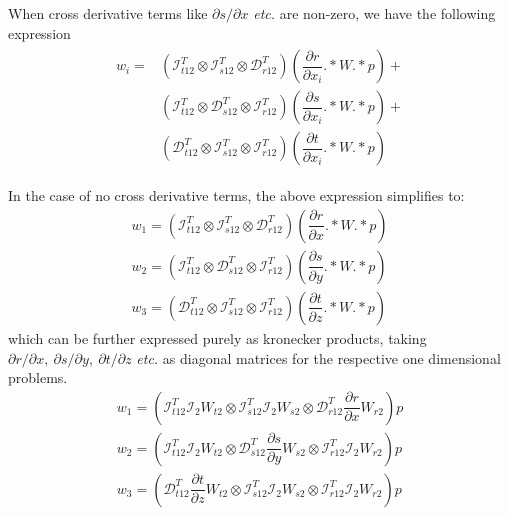 \documentclass{kthreport}
\begin{document}
When cross derivative terms like $\partial s/\partial x$ \textit{etc.} are non-zero, we have the following expression
\begin{eqnarray}
	\begin{split}
		w_{i}	=&  (\mathcal{I}^{T}_{t12}\otimes\mathcal{I}^{T}_{s12}\otimes\mathcal{D}^{T}_{r12})(\dfrac{\partial r}{\partial x_{i}}.*W.*p) + \\
		& (\mathcal{I}^{T}_{t12}\otimes\mathcal{D}^{T}_{s12}\otimes\mathcal{I}^{T}_{r12})(\dfrac{\partial s}{\partial x_{i}}.*W.*p) + \\
		& (\mathcal{D}^{T}_{t12}\otimes\mathcal{I}^{T}_{s12}\otimes\mathcal{I}^{T}_{r12})(\dfrac{\partial t}{\partial {x_{i}}}.*W.*p)			
	\end{split}
\end{eqnarray}

In the case of no cross derivative terms, the above expression simplifies to:
\begin{subequations}
	\begin{eqnarray}
		w_{1}	= (\mathcal{I}^{T}_{t12}\otimes\mathcal{I}^{T}_{s12}\otimes\mathcal{D}^{T}_{r12})(\dfrac{\partial r}{\partial x}.*W.*p) \\
		w_{2}	= (\mathcal{I}^{T}_{t12}\otimes\mathcal{D}^{T}_{s12}\otimes\mathcal{I}^{T}_{r12})(\dfrac{\partial s}{\partial y}.*W.*p) \\
		w_{3}	= (\mathcal{D}^{T}_{t12}\otimes\mathcal{I}^{T}_{s12}\otimes\mathcal{I}^{T}_{r12})(\dfrac{\partial t}{\partial z}.*W.*p)
	\end{eqnarray}
\end{subequations}
which can be further expressed purely as kronecker products, taking $\partial r/\partial x,\ \partial s/\partial y,\ \partial t/\partial z$ \textit{etc.} as diagonal matrices for the respective one dimensional problems.
\begin{subequations}
	\begin{eqnarray}
		w_{1}	= (\mathcal{I}^{T}_{t12}\mathcal{I}_{2}W_{t2}\otimes\mathcal{I}^{T}_{s12}\mathcal{I}_{2}W_{s2}\otimes\mathcal{D}^{T}_{r12}\dfrac{\partial r}{\partial x}W_{r2})p \\
		w_{2}	= (\mathcal{I}^{T}_{t12}\mathcal{I}_{2}W_{t2}\otimes\mathcal{D}^{T}_{s12}\dfrac{\partial s}{\partial y}W_{s2}\otimes\mathcal{I}^{T}_{r12}\mathcal{I}_{2}W_{r2})p \\
		w_{3}	= (\mathcal{D}^{T}_{t12}\dfrac{\partial t}{\partial z}W_{t2}\otimes\mathcal{I}^{T}_{s12}\mathcal{I}_{2}W_{s2}\otimes\mathcal{I}^{T}_{r12}\mathcal{I}_{2}W_{r2})p
	\end{eqnarray}
\end{subequations}
\end{document}
